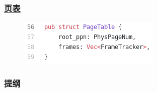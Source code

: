 \begin{frame}
    \frametitle{\href{https://github.com/rcore-os/rCore-Tutorial-v3/blob/ch4/os/src/mm/page_table.rs\#L56}{页表}}
% 
% 
    \begin{figure}
        \centering
        \includegraphics[width=0.6\linewidth]{figs/page_table-56.png}
    \end{figure}
% 
% 
% 
% 
\end{frame}
\begin{frame}
\frametitle{提纲} %
\tableofcontents %
\end{frame}



